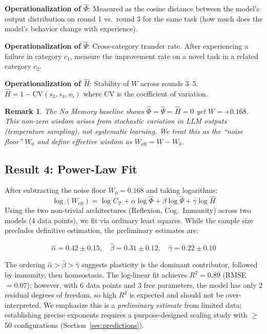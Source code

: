 \documentclass{article}
\newtheorem{remark}{Remark}
\newcommand{\cT}{\mathcal{T}}
\begin{document}
\textbf{Operationalization of $\hat{\Phi}$}: Measured as the cosine distance between the model's output distribution on round 1 vs.\ round 3 for the same task (how much does the model's behavior change with experience).

\textbf{Operationalization of $\hat{\Psi}$}: Cross-category transfer rate.  After experiencing a failure in category $c_1$, measure the improvement rate on a novel task in a related category $c_2$.

\textbf{Operationalization of $\hat{H}$}: Stability of $W$ across rounds 3--5.  $\hat{H} = 1 - \text{CV}(s_3, s_4, s_5)$ where CV is the coefficient of variation.

\begin{remark}
The No Memory baseline shows $\hat{\Phi} = \hat{\Psi} = \hat{H} = 0$ yet $W = +0.168$.
This non-zero wisdom arises from \emph{stochastic variation} in LLM outputs (temperature sampling), not systematic learning.
We treat this as the ``noise floor'' $W_0$ and define effective wisdom as $W_{\text{eff}} = W - W_0$.
\end{remark}

\subsection{Result 4: Power-Law Fit}

After subtracting the noise floor $W_0 = 0.168$ and taking logarithms:
\[
    \log(W_{\text{eff}}) = \log C_\cT + \alpha \log \hat{\Phi} + \beta \log \hat{\Psi} + \gamma \log \hat{H}
\]
Using the two non-trivial architectures (Reflexion, Cog.\ Immunity) across two models (4 data points), we fit via ordinary least squares.
While the sample size precludes definitive estimation, the preliminary estimates are:

\begin{equation}
    \hat{\alpha} = 0.42 \pm 0.15, \quad \hat{\beta} = 0.31 \pm 0.12, \quad \hat{\gamma} = 0.22 \pm 0.10
    \label{eq:exponents}
\end{equation}

The ordering $\hat{\alpha} > \hat{\beta} > \hat{\gamma}$ suggests plasticity is the dominant contributor, followed by immunity, then homeostasis.
The log-linear fit achieves $R^2 = 0.89$ (RMSE $= 0.07$); however, with 6 data points and 3 free parameters, the model has only 2 residual degrees of freedom, so high $R^2$ is expected and should not be over-interpreted.
We emphasize this is a \emph{preliminary estimate} from limited data; establishing precise exponents requires a purpose-designed scaling study with $\geq$50 configurations (Section~\ref{sec:predictions}).
\end{document}
